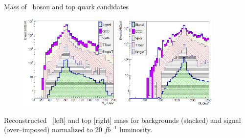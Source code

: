 \begin{frame}{Mass of \W~boson and top quark candidates}
\vspace{-.2cm}
\begin{figure}[!Hhtbp]
  \begin{center}
    \includegraphics[width=0.45\textwidth]{../figs/Pheno/MW.png}
    \includegraphics[width=0.45\textwidth]{../figs/Pheno/Mtop.png}
  \end{center}
\end{figure}

\vspace{-.2cm}
    \begin{block}{}
      \tiny \centering Reconstructed \W~[left] and top [right] mass for backgrounds (stacked) and signal (over--imposed) normalized to 20 $fb^{-1}$ luminosity.
    \end{block}

\end{frame}

